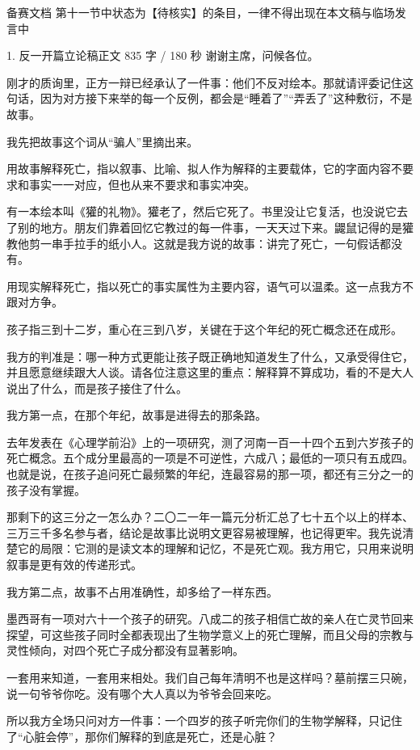 \documentclass[script,con]{debate}
\begin{document}
\debatetitle
\begin{contingency}备赛文档 第十一节中状态为【待核实】的条目，一律不得出现在本文稿与临场发言中\end{contingency}
\begin{speech}{1. 反一开篇立论稿}{正文 835 字 / 180 秒}
谢谢主席，问候各位。

刚才的质询里，正方一辩已经承认了一件事：他们不反对绘本。那就请评委记住这句话，因为对方接下来举的每一个反例，都会是“睡着了”“弄丢了”这种敷衍，不是故事。

我先把故事这个词从“骗人”里摘出来。

用故事解释死亡，指以叙事、比喻、拟人作为解释的主要载体，它的字面内容不要求和事实一一对应，但也从来不要求和事实冲突。

有一本绘本叫《獾的礼物》。獾老了，然后它死了。书里没让它复活，也没说它去了别的地方。朋友们靠着回忆它教过的每一件事，一天天过下来。鼹鼠记得的是獾教他剪一串手拉手的纸小人。这就是我方说的故事：讲完了死亡，一句假话都没有。

用现实解释死亡，指以死亡的事实属性为主要内容，语气可以温柔。这一点我方不跟对方争。

孩子指三到十二岁，重心在三到八岁，关键在于这个年纪的死亡概念还在成形。

我方的判准是：哪一种方式更能让孩子既正确地知道发生了什么，又承受得住它，并且愿意继续跟大人谈。请各位注意这里的重点：解释算不算成功，看的不是大人说出了什么，而是孩子接住了什么。

我方第一点，在那个年纪，故事是进得去的那条路。

去年发表在《心理学前沿》上的一项研究，测了河南一百一十四个五到六岁孩子的死亡概念。五个成分里最高的一项是不可逆性，六成八；最低的一项只有五成四。也就是说，在孩子追问死亡最频繁的年纪，连最容易的那一项，都还有三分之一的孩子没有掌握。

那剩下的这三分之一怎么办？二〇二一年一篇元分析汇总了七十五个以上的样本、三万三千多名参与者，结论是故事比说明文更容易被理解，也记得更牢。我先说清楚它的局限：它测的是读文本的理解和记忆，不是死亡观。我方用它，只用来说明叙事是更有效的传递形式。

我方第二点，故事不占用准确性，却多给了一样东西。

墨西哥有一项对六十一个孩子的研究。八成二的孩子相信亡故的亲人在亡灵节回来探望，可这些孩子同时全都表现出了生物学意义上的死亡理解，而且父母的宗教与灵性倾向，对四个死亡子成分都没有显著影响。

一套用来知道，一套用来相处。我们自己每年清明不也是这样吗？墓前摆三只碗，说一句爷爷你吃。没有哪个大人真以为爷爷会回来吃。

所以我方全场只问对方一件事：一个四岁的孩子听完你们的生物学解释，只记住了“心脏会停”，那你们解释的到底是死亡，还是心脏？

\begin{contingency}
\end{contingency}
\end{speech}
\end{document}
